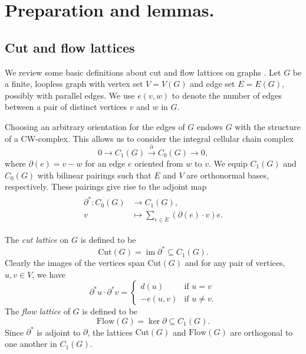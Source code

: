 \documentclass[11pt]{amsart}
\numberwithin{equation}{section}
\def\Cut{{\mathrm{Cut}}}
\def\Flow{{\mathrm{Flow}}}
\def\Cut{{\mathrm{Cut}}}
\def\Flow{{\mathrm{Flow}}}
\DeclareMathOperator{\im}{im}
\begin{document}
\section{Preparation and lemmas.}

\subsection{Cut and flow lattices}
We review some basic definitions about cut and flow lattices on graphs \cite{GodsilRoyle2001, Greene2013}.
Let $G$ be a finite, loopless graph with vertex set $V=V(G)$ and edge set $E=E(G)$, possibly with parallel edges.
We use $e(v,w)$ to denote the number of edges between a pair of distinct vertices $v$ and $w$ in $G$.

Choosing an arbitrary orientation for the edges of $G$ endows $G$ with the structure of a CW-complex. This allows us to consider the integral cellular chain complex
\begin{equation}\label{eq:cellular_chain_complex}
0\longrightarrow C_1(G) \overset{\partial}{\longrightarrow} C_0(G)\longrightarrow 0,
\end{equation}
where $\partial (e)= v-w$ for an edge $e$ oriented from $w$ to $v$.
We equip $C_1(G)$ and $C_0(G)$ with bilinear pairings such that $E$ and $V$ are orthonormal bases, respectively. These pairings give rise to the adjoint map
\begin{align}\begin{split}   
\partial^* : C_0(G)&\longrightarrow C_1(G),\\
v&\longmapsto \sum_{e \in E} (\partial(e) \cdot v) e.
\end{split}
\end{align}

The \emph{cut lattice} on $G$ is defined to be 
\[
\Cut(G)=\im \partial^* \subseteq C_1(G).
\]
Clearly the images of the vertices span $\Cut(G)$ and for any pair of vertices, $u,v\in V$, we have
\begin{equation}\label{eq:coboundary_graph_embedding}
\partial^* u \cdot \partial^* v = \begin{cases}
    d(u) &\text{if $u=v$}\\
    -e(u,v)&\text{if $u\neq v$}.
\end{cases}
\end{equation}
The \emph{flow lattice} of $G$ is defined to be
\[
\Flow(G)=\ker \partial \subseteq C_1(G).
\]
Since $\partial^*$ is adjoint to $\partial$, the lattices $\Cut(G)$ and $\Flow(G)$ are orthogonal to one another in $C_1(G)$.
\end{document}
